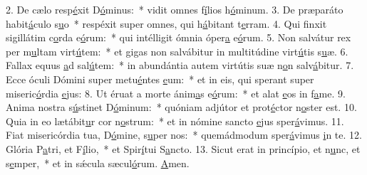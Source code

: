 2. De cælo resp\uline{é}xit D\uline{ó}minus:~* vidit omnes f\uline{í}lios h\uline{ó}minum.
3. De præparáto habit\uline{á}culo s\uline{u}o~* respéxit super omnes, qui h\uline{á}bitant t\uline{e}rram.
4. Qui finxit sigillátim c\uline{o}rda e\uline{ó}rum:~* qui intélligit ómnia óper\uline{a} e\uline{ó}rum.
5. Non salvátur rex per m\uline{u}ltam virt\uline{ú}tem:~* et gigas non salvábitur in multitúdine virt\uline{ú}tis s\uline{u}æ.
6. Fallax equus \uline{a}d sal\uline{ú}tem:~* in abundántia autem virtútis suæ n\uline{o}n salv\uline{á}bitur.
7. Ecce óculi Dómini super metu\uline{é}ntes \uline{e}um:~* et in eis, qui sperant super miseric\uline{ó}rdia \uline{e}jus:
8. Ut éruat a morte ánim\uline{a}s e\uline{ó}rum:~* et alat \uline{e}os in f\uline{a}me.
9. Anima nostra s\uline{ú}stinet D\uline{ó}minum:~* quóniam adjútor et prot\uline{é}ctor n\uline{o}ster est.
10. Quia in eo lætábit\uline{u}r cor n\uline{o}strum:~* et in nómine sancto \uline{e}jus sper\uline{á}vimus.
11. Fiat misericórdia tua, D\uline{ó}mine, s\uline{u}per nos:~* quemádmodum sper\uline{á}vimus \uline{i}n te.
12. Glória P\uline{a}tri, et F\uline{í}lio,~* et Spir\uline{í}tui S\uline{a}ncto.
13. Sicut erat in princípio, et n\uline{u}nc, et s\uline{e}mper,~* et in sǽcula sæcul\uline{ó}rum. \uline{A}men.
